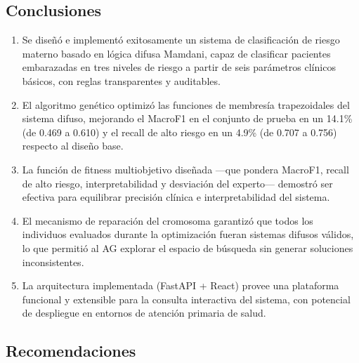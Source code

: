 \documentclass[11pt]{article}
\begin{document}
\subsection{Conclusiones}


\begin{enumerate}
    \item Se dise\~n\'o e implement\'o exitosamente un sistema de clasificaci\'on de riesgo materno basado en l\'ogica difusa Mamdani, capaz de clasificar pacientes embarazadas en tres niveles de riesgo a partir de seis par\'ametros cl\'inicos b\'asicos, con reglas transparentes y auditables.

    \item El algoritmo gen\'etico optimiz\'o las funciones de membres\'ia trapezoidales del sistema difuso, mejorando el MacroF1 en el conjunto de prueba en un 14.1\% (de 0.469 a 0.610) y el recall de alto riesgo en un 4.9\% (de 0.707 a 0.756) respecto al dise\~no base.

    \item La funci\'on de fitness multiobjetivo dise\~nada ---que pondera MacroF1, recall de alto riesgo, interpretabilidad y desviaci\'on del experto--- demostr\'o ser efectiva para equilibrar precisi\'on cl\'inica e interpretabilidad del sistema.

    \item El mecanismo de reparaci\'on del cromosoma garantiz\'o que todos los individuos evaluados durante la optimizaci\'on fueran sistemas difusos v\'alidos, lo que permiti\'o al AG explorar el espacio de b\'usqueda sin generar soluciones inconsistentes.

    \item La arquitectura implementada (FastAPI + React) provee una plataforma funcional y extensible para la consulta interactiva del sistema, con potencial de despliegue en entornos de atenci\'on primaria de salud.
\end{enumerate}



\subsection{Recomendaciones}
\end{document}
